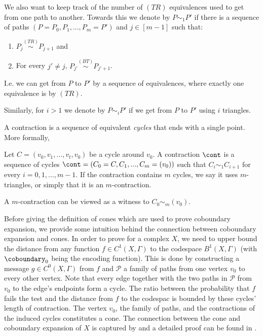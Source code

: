 We also want to keep track of the number of \((TR)\) equivalences used to get from one path to another. Towards this we denote by \(P \sim_1 P'\) if there is a sequence of paths \((P=P_0,P_1,...,P_m=P')\) and \(j \in [m-1]\) such that:
\begin{enumerate}
    \item \(P_j \overset{(TR)}{\sim} P_{j+1}\) and
    \item For every \(j' \ne j\), \(P_{j'} \overset{(BT)}{\sim} P_{j'+1}\).
\end{enumerate}
I.e. we can get from \(P\) to \(P'\) by a sequence of equivalences, where exactly one equivalence is by \((TR)\).

Similarly, for \(i >1\) we denote by \(P \sim_i P'\) if we get from \(P\) to \(P'\) using \(i\) triangles. 

A contraction is a sequence of equivalent \textit{cycles} that ends with a single point. More formally,
\begin{definition}
    Let \(C = (v_0,v_1,\dots,v_t,v_0)\) be a cycle around \(v_0\). A contraction \(\cont\) is a sequence of cycles \(\cont = (C_0 = C,C_1,...,C_m = (v_0))\) such that \(C_i \sim_1 C_{i+1}\) for every \(i=0,1,\dots,m-1\). If the contraction contains \(m\) cycles, we say it uses \(m\)-triangles, or simply that it is an \(m\)-contraction.
\end{definition}
A \(m\)-contraction can be viewed as a witness to \(C_0 \sim_m (v_0)\).




Before giving the definition of cones which are used to prove coboundary expansion, we provide some intuition behind the connection between coboundary expansion and cones.
%
In order to prove  for a complex $X$, we need to upper bound the distance from any function $f\in C^1(X,\Gamma)$ to the codespace $B^1(X,\Gamma)$ (with $\coboundary_0$ being the encoding function). This is done by constructing a message $g\in  C^0(X,\Gamma)$ from $f$ and $\mathcal{P}$ a family of paths from one vertex $v_0$ to every other vertex. 
Note that every edge together with the two paths in $\mathcal{P}$ from $v_0$ to the edge's endpoints form a cycle.
The ratio between the probability that $f$ fails the test and the distance from $f$ to the codespac is bounded by these cycles' length of contraction.  
The vertex $v_0$, the family of paths, and the contractions of the induced cycles constitutes a cone. 
The connection between the cone and coboundary expansion of $X$ is captured by  and a detailed proof can be found in \cite{DiksteinD2023swap}.

